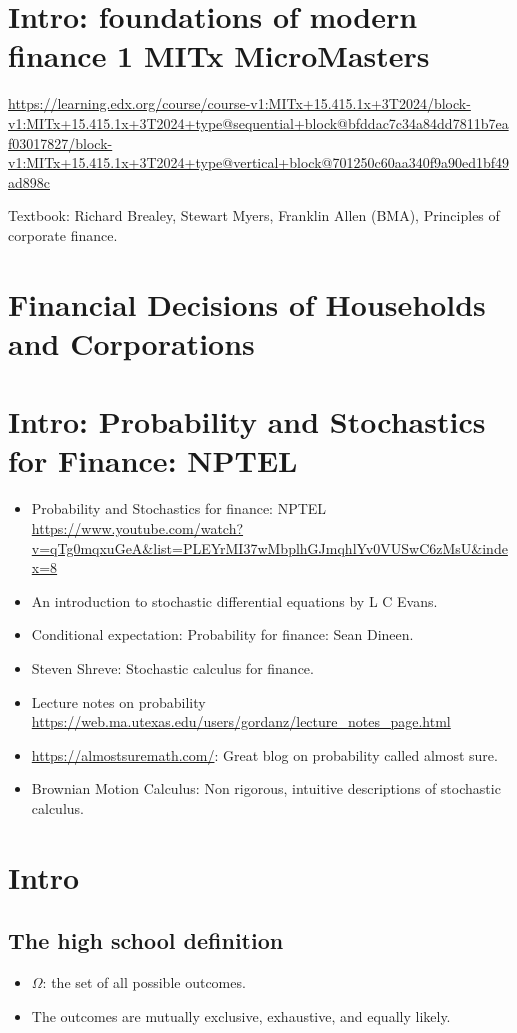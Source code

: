 \documentclass{book}
\theoremstyle{definition}
\begin{document}
\tableofcontents

\chapter{Intro: foundations of modern finance 1 MITx MicroMasters}
\url{https://learning.edx.org/course/course-v1:MITx+15.415.1x+3T2024/block-v1:MITx+15.415.1x+3T2024+type@sequential+block@bfddac7c34a84dd7811b7eaf03017827/block-v1:MITx+15.415.1x+3T2024+type@vertical+block@701250c60aa340f9a90ed1bf49ad898c}

Textbook: Richard Brealey, Stewart Myers, Franklin Allen (BMA), Principles of corporate finance.

\chapter{Financial Decisions of Households and Corporations}

\chapter{Intro: Probability and Stochastics for Finance: NPTEL}
\begin{itemize}
\item Probability and Stochastics for finance: NPTEL
\url{https://www.youtube.com/watch?v=qTg0mqxuGeA&list=PLEYrMI37wMbplhGJmqhlYv0VUSwC6zMsU&index=8}
\item An introduction to stochastic differential equations by L C Evans.
\item Conditional expectation: Probability for finance: Sean Dineen.
\item Steven Shreve: Stochastic calculus for finance.
\item Lecture notes on probability \url{https://web.ma.utexas.edu/users/gordanz/lecture_notes_page.html}
\item \url{https://almostsuremath.com/}: Great blog on probability called almost sure.
\item Brownian Motion Calculus: Non rigorous, intuitive descriptions of stochastic calculus.
\end{itemize}
\chapter{Intro}

\section{The high school definition}
\begin{itemize}
\item $\Omega$: the set of all possible outcomes.
\item The outcomes are mutually exclusive, exhaustive, and equally likely.
\end{itemize}
\end{document}
